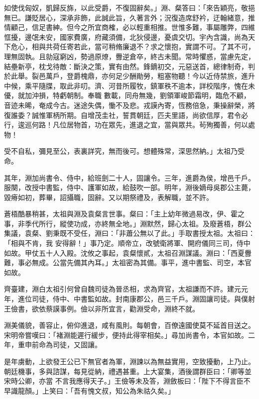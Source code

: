 \begin{pinyinscope}
 如使伐匈奴，凱歸反旆，以此受爵，不復固辭矣。」淵、粲答曰：「來告穎亮，敬挹無已。謙貶居心，深承非飾，此誠此旨，久著言外；況復造席舒衿，迂翰緒意，推情顧己，信足書紳。但今之所宜商榷，必以輕重相推。世惟多難，事屬雕弊，四維恇擾，邊氓未安，國家費廣，府藏須備，北狄侵邊，憂虞交切。宇內含識，尚為天下危心，相與共荷任寄若此，當可稍脩廉退不？求之懷抱，實謂不可。了其不可，理無固執。且勍寇窮凶，勢過原燎，釁逆倉卒，終古未聞。常時懼惑，當慮先定，結壘新亭，枕戈待敵：斷決之策，實有由然。鋒鏑初交，元惡送首，總律制奇，判於此舉。裂邑萬戶，登爵槐鼎，亦何足少酬勛勞，粗塞物聽！今以近侍禁旅，進升中候，乘平隨牒，取此非叨。濟、河昔所履牧，鎮軍秩不逾本，詳校階序，愧在未優，就加沖損，特虧朝制。奉職
 數載，同舟無幾，劉領軍峻節霜明，臨危不顧，音迹未晞，奄成今古。迷途失偶，慟不及悲。戎謨內寄，恆務倍急，秉操辭榮，將復誰委？誠惟軍柄所期。自增茂圭社，誓貫朝廷，匹夫里語，尚欲信厚，君令必行，逡巡何路！凡位居物首，功在眾先，進退之宜，當與眾共。茍殉獨善，何以處物！



 受不自私，彌見至公，表裏詳究，無而後可。想體殊常，深思然納。」太祖乃受命。



 其年，淵加尚書令、侍中，給班劍二十人，固讓令。三年，進爵為侯，增邑千戶。服闋，改授中書監，侍中、護軍如故，給鼓吹一部。明年，淵後嫡母吳郡公主薨，毀瘠如初，葬畢，詔攝職，固辭。又以期祭禮及，表解職，並不許。



 蒼梧酷暴稍甚，太祖與淵及袁粲言世事。粲曰：「主上幼年微過易改，伊、霍之事，非季代所行，縱使功成，亦終無全地。」淵默然，歸心太祖。及廢蒼梧，群公集議，袁粲、劉秉既不受任，淵曰：「非蕭公無以了此。」手取書授太祖。太祖曰：「相與不肯，我
 安得辭！」事乃定。順帝立，改號衛將軍、開府儀同三司，侍中如故。甲仗五十人入殿。沈攸之事起，袁粲懷貳，太祖召淵謀議。淵曰：「西夏釁難，事必無成。公當先備其內耳。」太祖密為其備。事平，進中書監、司空，本官如故。



 齊臺建，淵白太祖引何曾自魏司徒為晉丞相，求為齊官，太祖謙而不許。建元元年，進位司徒，侍中、中書監如故。封南康郡公，邑三千戶。淵固讓司徒。與僕射王儉書，欲依蔡謨事例。儉以非所宜言，勸淵受命，淵終不就。



 淵美儀貌，善容止，俯仰進退，咸有風則。每朝會，百僚遠國使莫不延首目送之。宋明帝嘗嘆曰：「褚淵能遲行緩步，便持此得宰相矣。」尋加尚書令，本官如故。二年，重申前命為司徒，又固讓。



 是年虜動，上欲發王公已下無官者為軍，淵諫以為無益實用，空致擾動，上乃止。朝廷機事，多與諮謀，每見從納，禮遇甚重。上大宴集，酒後謂群臣曰：「卿等並宋時公卿，亦當
 不言我應得天子。」王儉等未及答，淵斂板曰：「陛下不得言臣不早識龍顏。」上笑曰：「吾有愧文叔，知公為朱祜久矣。」




\end{pinyinscope}
